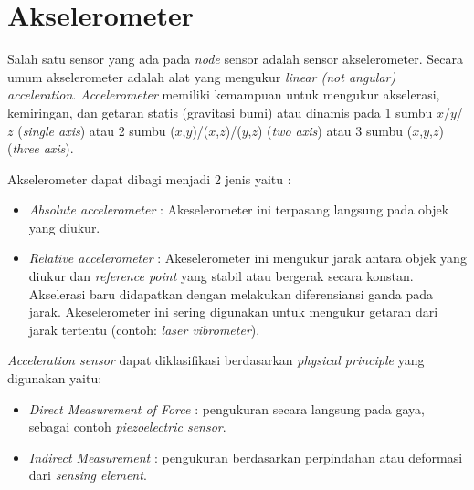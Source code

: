 \section{Akselerometer \cite{pavel:0:sensor}}
\label{sec:aks}
Salah satu sensor yang ada pada {\it node} sensor adalah sensor akselerometer. Secara umum akselerometer adalah alat yang mengukur {\it linear (not angular) acceleration}. {\it Accelerometer} memiliki kemampuan untuk mengukur akselerasi, kemiringan, dan getaran statis (gravitasi bumi) atau dinamis pada 1 sumbu $x$/$y$/$z$ ({\it single axis}) atau 2 sumbu ($x$,$y$)/($x$,$z$)/($y$,$z$) ({\it two axis}) atau 3 sumbu ($x$,$y$,$z$) ({\it three axis}). 

Akselerometer dapat dibagi menjadi 2 jenis yaitu :
	\begin{itemize}
		\item {\it Absolute accelerometer} : Akeselerometer ini terpasang langsung pada objek yang diukur.
		\item {\it Relative accelerometer} : Akeselerometer ini mengukur jarak antara objek yang diukur dan {\it reference point} yang stabil atau bergerak secara konstan. Akselerasi baru didapatkan dengan melakukan diferensiansi ganda pada jarak. Akeselerometer ini sering digunakan untuk mengukur getaran dari jarak tertentu (contoh: {\it laser vibrometer}).
	\end{itemize}
{\it Acceleration sensor} dapat diklasifikasi berdasarkan {\it physical principle} yang digunakan yaitu:
	\begin{itemize}
		\item {\it Direct Measurement of Force} : pengukuran secara langsung pada gaya, sebagai contoh {\it piezoelectric sensor}. 
		\item {\it Indirect Measurement} : pengukuran berdasarkan  perpindahan atau deformasi dari {\it sensing element}.
	\end{itemize}


